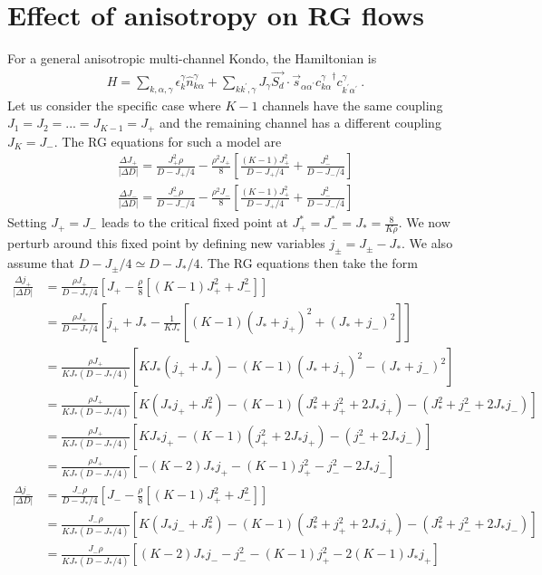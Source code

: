 \documentclass{revtex4-2}
\begin{document}
\section{Effect of anisotropy on RG flows}
For a general anisotropic multi-channel Kondo, the Hamiltonian is
\begin{align}
	H = \sum_{k,\alpha,\gamma}\epsilon_{k}^\gamma \hat n^\gamma_{k\alpha} + \sum_{kk^\prime,\gamma}J_\gamma \vec{S_d}\cdot\vec{s}_{\alpha\alpha^\prime}{c^\gamma_{k\alpha}}^\dagger c^\gamma_{k^\prime\alpha^\prime}~.
\end{align}
Let us consider the specific case where \(K-1\) channels have the same coupling \(J_1 = J_2 = ... = J_{K-1} = J_+\) and the remaining channel has a different coupling \(J_K = J_-\). The RG equations for such a model are
\begin{align}
	\frac{\Delta J_+}{|\Delta D|} = \frac{J_+^2 \rho}{D - J_+/4} - \frac{\rho^2 J_+}{8}\left[\frac{(K-1)J_+^2}{D - J_+/4} + \frac{J_-^2}{D - J_-/4}\right]\\
	\frac{\Delta J_-}{|\Delta D|} = \frac{J_-^2 \rho}{D - J_-/4} - \frac{\rho^2 J_-}{8}\left[\frac{(K-1)J_+^2}{D - J_+/4} + \frac{J_-^2}{D - J_-/4}\right]
\end{align}
Setting \(J_+ = J_-\) leads to the critical fixed point at \(J_+^* = J_-^* = J_* = \frac{8}{K \rho}\). We now perturb around this fixed point by defining new variables \(j_\pm = J_\pm - J_*\). We also assume that \(D - J_\pm / 4 \simeq D - J_*/4\). The RG equations then take the form
\begin{align}
	\frac{\Delta j_+}{|\Delta D|} &= \frac{\rho J_+}{D - J_*/4}\left[J_+ - \frac{\rho}{8}\left[(K-1)J_+^2 + J_-^2\right]\right]\\
				      &= \frac{\rho J_+}{D - J_*/4}\left[j_+ + J_*- \frac{1}{K J_*}\left[(K-1)\left(J_* + j_+\right)^2 + \left(J_* + j_-\right)^2\right]\right]\\
				      &= \frac{\rho J_+}{K J_*\left(D - J_*/4\right)}\left[KJ_*\left(j_+ + J_*\right) - (K-1)\left(J_* + j_+\right)^2 - \left(J_* + j_-\right)^2\right]\\
				      &= \frac{\rho J_+}{K J_*\left(D - J_*/4\right)}\left[K\left(J_*j_+ + J_*^2\right) - (K-1)\left(J_*^2 + j_+^2 + 2J_* j_+\right) - \left(J_*^2 + j_-^2 + 2J_* j_-\right)\right]\\
				      &= \frac{\rho J_+}{K J_*\left(D - J_*/4\right)}\left[KJ_*j_+ - (K-1)\left(j_+^2 + 2J_* j_+\right) - \left(j_-^2 + 2J_* j_-\right)\right]\\
				      &= \frac{\rho J_+}{K J_*\left(D - J_*/4\right)}\left[-\left(K - 2\right)J_*j_+ - (K-1)j_+^2 - j_-^2 - 2J_* j_-\right]\\
	\frac{\Delta j_-}{|\Delta D|} &= \frac{J_- \rho}{D - J_*/4}\left[J_- - \frac{\rho}{8}\left[(K-1)J_+^2 + J_-^2\right]\right]\\
				      &= \frac{J_- \rho}{K J_*\left(D - J_*/4\right)}\left[K\left(J_*j_- + J_*^2\right) - (K-1)\left(J_*^2 + j_+^2 + 2J_* j_+\right) - \left(J_*^2 + j_-^2 + 2J_* j_-\right)\right]\\
				      &= \frac{J_- \rho}{K J_*\left(D - J_*/4\right)}\left[\left(K - 2\right)J_*j_-  - j_-^2 - (K-1)j_+^2 - 2(K-1)J_* j_+\right]\\
\end{align}
\end{document}
